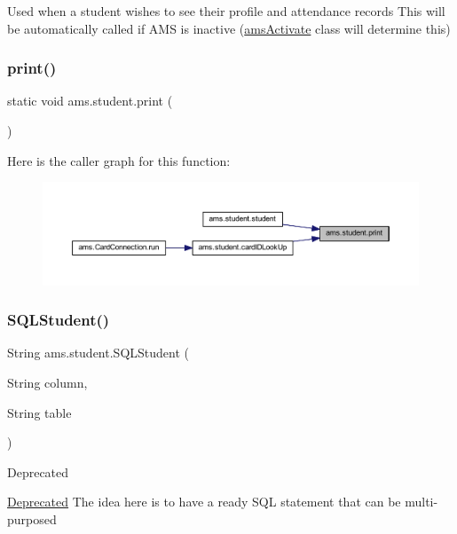 Used when a student wishes to see their profile and attendance records This will be automatically called if A\+MS is inactive (\mbox{\hyperlink{classams_1_1ams_activate}{ams\+Activate}} class will determine this) \mbox{\label{classams_1_1student_a7a8c1d0c0952dfd7e9e71f90bd70d09e}} 
\subsubsection{\texorpdfstring{print()}{print()}}
{\footnotesize\ttfamily static void ams.\+student.\+print (\begin{DoxyParamCaption}{ }\end{DoxyParamCaption})\hspace{0.3cm}{\ttfamily [static]}}

Here is the caller graph for this function\+:\nopagebreak
\begin{figure}[H]
\begin{center}
\leavevmode
\includegraphics[width=350pt]{classams_1_1student_a7a8c1d0c0952dfd7e9e71f90bd70d09e_icgraph}
\end{center}
\end{figure}
\mbox{\label{classams_1_1student_aaf15213b221829a2c44c15a859af9da2}} 
\subsubsection{\texorpdfstring{SQLStudent()}{SQLStudent()}}
{\footnotesize\ttfamily String ams.\+student.\+S\+Q\+L\+Student (\begin{DoxyParamCaption}\item[{String}]{column,  }\item[{String}]{table }\end{DoxyParamCaption})}

\begin{DoxyRefDesc}{Deprecated}
\item[\mbox{\hyperlink{deprecated__deprecated000002}{Deprecated}}]The idea here is to have a ready S\+QL statement that can be multi-\/purposed \end{DoxyRefDesc}

